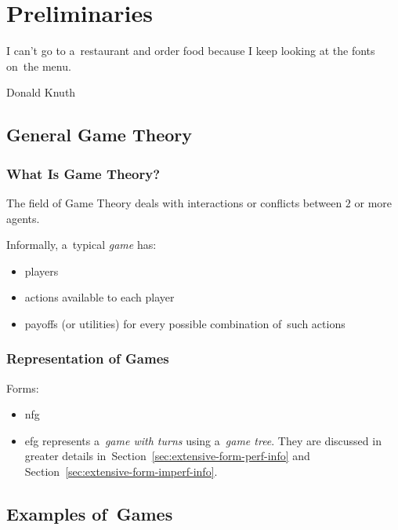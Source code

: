 \chapter{Preliminaries}
\epigraph{
  I can't go to a~restaurant and order food because I keep looking at the fonts on~the menu.
}{Donald Knuth}

\section{General Game Theory}

\subsection{What Is Game Theory?}

The field of Game Theory deals with interactions or conflicts between $2$ or more agents.
\todo

Informally, a~typical \emph{game} has:
\begin{itemize}
  \item players
  \item actions available to each player
  \item payoffs (or utilities) for every possible combination of~such actions
\end{itemize}

\subsection{Representation of Games}

\todo
Forms:
\begin{itemize}
  \item \acrfull{nfg}
  \item \acrfull{efg} represents a~\emph{game with turns} using a~\emph{game tree}.
    They are discussed in greater details in~Section~\ref{sec:extensive-form-perf-info} and Section~\ref{sec:extensive-form-imperf-info}.
\end{itemize}

\section{Examples of~Games}

